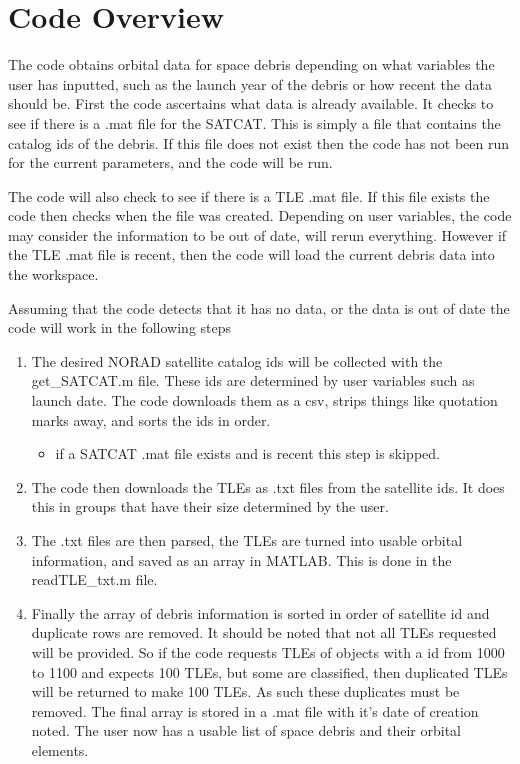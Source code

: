 \documentclass[12pt]{report}
\begin{document}
	\section{Code Overview}
	The code obtains orbital data for space debris depending on what variables the user has inputted, such as the launch year of the debris or how recent the data should be.
	First the code ascertains what data is already available. It checks to see if there is a .mat file for the SATCAT. This is simply a file that contains the catalog ids of the debris. If this file does not exist then the code has not been run for the current parameters, and the code will be run. \par 
	The code will also check to see if there is a TLE .mat file. If this file exists the code then checks when the file was created. Depending on user variables, the code may consider the information to be out of date, will rerun everything. However if the TLE .mat file is recent, then the code will load the current debris data into the workspace.\par 
	Assuming that the code detects that it has no data, or the data is out of date the code will work in the following steps\par 
	\begin{enumerate}
		\item The desired NORAD satellite catalog ids will be collected with the get\_SATCAT.m file. These ids are determined by user variables such as launch date. The code downloads them as a csv, strips things like quotation marks away, and sorts the ids in order.
		\begin{itemize}
			\item if a SATCAT .mat file exists and is recent this step is skipped.
		\end{itemize}  
		\item The code then downloads the TLEs as .txt files from the satellite ids. It does this in groups that have their size determined by the user. 
		\item The .txt files are then parsed, the TLEs are turned into usable orbital information, and saved as an array in MATLAB. This is done in the readTLE\_txt.m file.
		\item Finally the array of debris information is sorted in order of satellite id and duplicate rows are removed. It should be noted that not all TLEs requested will be provided. So if the code requests TLEs of objects with a id from 1000 to 1100 and expects 100 TLEs, but some are classified, then duplicated TLEs will be returned to make 100 TLEs. As such these duplicates must be removed. The final array is stored in a .mat file with it's date of creation noted. The user now has a usable list of space debris and their orbital elements.
	\end{enumerate}
\end{document}
